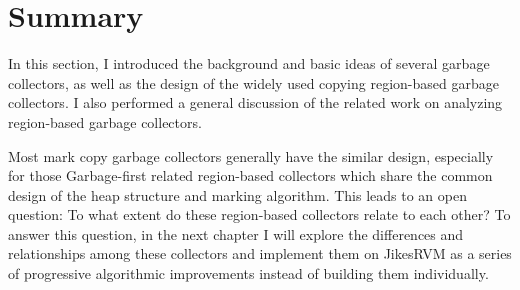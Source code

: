 \section{Summary}

In this section, I introduced the background and basic ideas of several garbage collectors,
as well as the design of the widely used copying region-based garbage collectors.
I also performed a general discussion of the related work on analyzing region-based garbage collectors.

Most mark copy garbage collectors generally have the similar design, especially for those
Garbage-first related region-based collectors which share the common design of the heap structure and
marking algorithm.
This leads to an open question: To what extent do these region-based collectors
relate to each other? To answer this question, in the next chapter I will explore the
differences and relationships among these collectors and implement them on JikesRVM
as a series of progressive algorithmic improvements instead of building them individually.
